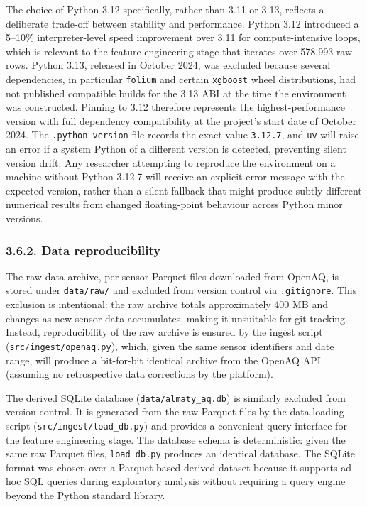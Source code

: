 The choice of Python 3.12 specifically, rather than 3.11 or 3.13, reflects a deliberate trade-off between stability and performance. Python 3.12 introduced a 5--10\% interpreter-level speed improvement over 3.11 for compute-intensive loops, which is relevant to the feature engineering stage that iterates over 578,993 raw rows. Python 3.13, released in October 2024, was excluded because several dependencies, in particular \texttt{folium} and certain \texttt{xgboost} wheel distributions, had not published compatible builds for the 3.13 ABI at the time the environment was constructed. Pinning to 3.12 therefore represents the highest-performance version with full dependency compatibility at the project's start date of October 2024. The \texttt{.python-version} file records the exact value \texttt{3.12.7}, and \texttt{uv} will raise an error if a system Python of a different version is detected, preventing silent version drift. Any researcher attempting to reproduce the environment on a machine without Python 3.12.7 will receive an explicit error message with the expected version, rather than a silent fallback that might produce subtly different numerical results from changed floating-point behaviour across Python minor versions.

\subsubsection{3.6.2. Data reproducibility}\label{data-reproducibility}

The raw data archive, per-sensor Parquet files downloaded from OpenAQ, is stored under \texttt{data/raw/} and excluded from version control via \texttt{.gitignore}. This exclusion is intentional: the raw archive totals approximately 400 MB and changes as new sensor data accumulates, making it unsuitable for git tracking. Instead, reproducibility of the raw archive is ensured by the ingest script (\texttt{src/ingest/openaq.py}), which, given the same sensor identifiers and date range, will produce a bit-for-bit identical archive from the OpenAQ API (assuming no retrospective data corrections by the platform).

The derived SQLite database (\texttt{data/almaty\_aq.db}) is similarly excluded from version control. It is generated from the raw Parquet files by the data loading script (\texttt{src/ingest/load\_db.py}) and provides a convenient query interface for the feature engineering stage. The database schema is deterministic: given the same raw Parquet files, \texttt{load\_db.py} produces an identical database. The SQLite format was chosen over a Parquet-based derived dataset because it supports ad-hoc SQL queries during exploratory analysis without requiring a query engine beyond the Python standard library.

